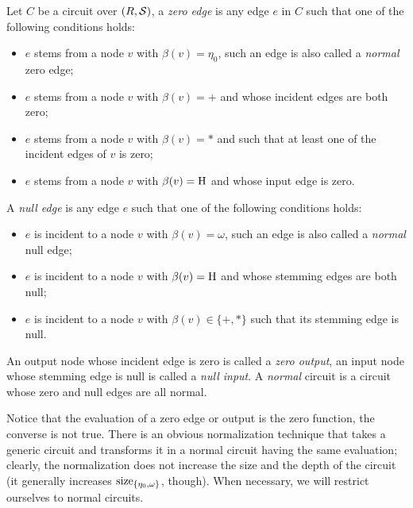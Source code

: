 \begin{definition}
  Let $C$ be a circuit over $(R,\mathcal{S})$, a \emph{zero edge} is any
  edge $e$ in $C$ such that one of the following conditions holds:
  \begin{itemize}
  \item $e$ stems from a node $v$ with $\beta(v)=\eta_0$, such an edge
    is also called a \emph{normal} zero edge;
  \item $e$ stems from a node $v$ with $\beta(v)=+$ and whose incident
    edges are both zero;
  \item $e$ stems from a node $v$ with $\beta(v)=*$ and such that at
    least one of the incident edges of $v$ is zero;
  \item $e$ stems from a node $v$ with $\beta(v)=\operatorname{H}$ and whose input
    edge is zero.
  \end{itemize}
  A \emph{null edge} is any edge $e$ such that one of the following
  conditions holds:
  \begin{itemize}
  \item $e$ is incident to a node $v$ with $\beta(v)=\omega$, such an
    edge is also called a \emph{normal} null edge;
  \item $e$ is incident to a node $v$ with $\beta(v)=\operatorname{H}$ and whose
    stemming edges are both null;
  \item $e$ is incident to a node $v$ with $\beta(v)\in\{+,*\}$ such
    that its stemming edge is null.
  \end{itemize}
  An output node whose incident edge is zero is called a \emph{zero
    output}, an input node whose stemming edge is null is called a
  \emph{null input}.  A \emph{normal} circuit is a circuit whose zero
  and null edges are all normal.
\end{definition}

Notice that the evaluation of a zero edge or output is the zero
function, the converse is not true.  There is an obvious normalization
technique that takes a generic circuit and transforms it in a normal
circuit having the same evaluation; clearly, the normalization does
not increase the size and the depth of the circuit (it generally
increases $\operatorname{size}_{\{\eta_0,\omega\}}$, though). When necessary, we
will restrict ourselves to normal circuits.

